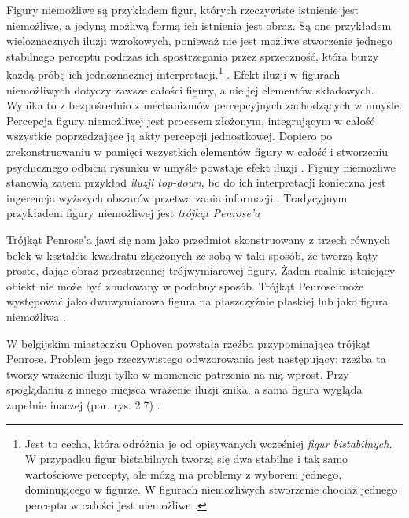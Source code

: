 \documentclass[licencjacka]{kdypl}
\begin{document}
Figury niemożliwe są przykładem figur, których rzeczywiste istnienie jest niemożliwe, a jedyną możliwą formą ich istnienia jest obraz. Są one przykładem wieloznacznych iluzji wzrokowych, ponieważ nie jest możliwe stworzenie jednego stabilnego perceptu podczas ich spostrzegania przez sprzeczność, która burzy każdą próbę ich jednoznacznej interpretacji.\footnote{Jest to cecha, która odróżnia je od opisywanych wcześniej \textit{figur bistabilnych}. W przypadku figur bistabilnych tworzą się dwa stabilne i tak samo wartościowe percepty, ale mózg ma problemy z wyborem jednego, dominującego w figurze. W figurach niemożliwych stworzenie chociaż jednego perceptu w całości jest niemożliwe \citep[s. 92-93]{Zeki}.} \citep[s. 290]{Mlodkowski}. Efekt iluzji w figurach niemożliwych dotyczy zawsze całości figury, a nie jej elementów składowych. Wynika to z bezpośrednio z mechanizmów percepcyjnych zachodzących w umyśle. Percepcja figury niemożliwej jest procesem złożonym, integrującym w całość wszystkie poprzedzające ją akty percepcji jednostkowej. Dopiero po zrekonstruowaniu w pamięci wszystkich elementów figury w całość i stworzeniu psychicznego odbicia rysunku w umyśle powstaje efekt iluzji \citep[s. 291]{Mlodkowski}. Figury niemożliwe stanowią zatem przykład \textit{iluzji top-down}, bo do ich interpretacji konieczna jest ingerencja wyższych obszarów przetwarzania informacji \citep[s. 4]{Wyklad5}. Tradycyjnym przykładem figury niemożliwej jest \textit{trójkąt Penrose'a} 



Trójkąt Penrose'a jawi się nam jako przedmiot skonstruowany z trzech równych belek w kształcie kwadratu złączonych ze sobą w taki sposób, że tworzą kąty proste, dając obraz przestrzennej trójwymiarowej figury. Żaden realnie istniejący obiekt nie może być zbudowany w podobny sposób. Trójkąt Penrose może występować jako dwuwymiarowa figura na płaszczyźnie płaskiej lub jako figura niemożliwa \citep[s. 291]{Mlodkowski}.

W belgijskim miasteczku Ophoven powstała rzeźba przypominająca trójkąt Penrose. Problem jego rzeczywistego odwzorowania jest następujący: rzeźba ta tworzy wrażenie iluzji tylko w momencie patrzenia na nią wprost. Przy spoglądaniu z innego miejsca wrażenie iluzji znika, a sama figura wygląda zupełnie inaczej (por. rys. 2.7) \citep[s. 29]{przybylski}. 
\end{document}
